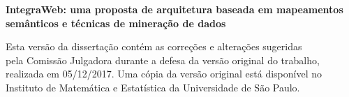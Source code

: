 \documentclass[11pt,twoside,a4paper]{book}
\begin{document}
%
%
%
\pagebreak

%
%
%
%

\newpage
\thispagestyle{empty}
    \begin{center}
        \vspace*{2.3 cm}
        \textbf{\Large{IntegraWeb: uma proposta de arquitetura baseada em
mapeamentos semânticos e técnicas de mineração de dados}}\\
        \vspace*{2 cm}
    \end{center}

    \vskip 2cm

    \begin{flushright}
	Esta versão da dissertação contém as correções e alterações sugeridas\\
	pela Comissão Julgadora durante a defesa da versão original do trabalho,\\
	realizada em 05/12/2017. Uma cópia da versão original está disponível no\\
	Instituto de Matemática e Estatística da Universidade de São Paulo.

    \vskip 2cm

    \end{flushright}
    \vskip 4.2cm
\end{document}
